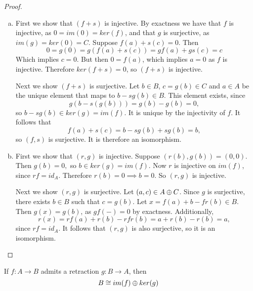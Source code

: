 \begin{proof}
\begin{enumerate}[(a)]
\item First we show that $(f+s)$ is injective. By exactness we have that $f$ is injective, as $0=im(0)=ker(f)$, and that $g$ is surjective, as $im(g)=ker(0)=C$. Suppose $f(a)+s(c)=0$. Then $$0=g(0)=g(f(a)+s(c))=gf(a)+gs(c)=c$$
Which implies $c=0$. But then $0=f(a)$, which implies $a=0$ as $f$ is injective. Therefore $ker(f+s)=0$, so $(f+s)$ is injective.

Next we show $(f+s)$ is surjective. Let $b\in B$, $c=g(b)\in C$ and $a\in A$ be the unique element that maps to $b-sg(b)\in B$. This element exists, since $$g(b-s(g(b)))=g(b)-g(b)=0,$$ so $b-sg(b)\in ker(g)=im(f)$. It is unique by the injectivity of $f$. It follows that $$f(a)+s(c)=b-sg(b)+sg(b)=b,$$ so $(f,s)$ is surjective. It is therefore an isomorphism.

\item First we show that $(r,g)$ is injective. Suppose $(r(b),g(b))=(0,0)$. Then $g(b)=0,$ so $b\in ker(g)=im(f)$. Now $r$ is injective on $im(f)$, since $rf=id_A$. Therefore $r(b)=0\implies b=0$. So $(r,g)$ is injective.

Next we show $(r,g)$ is surjective. Let $(a,c)\in A\oplus C$. Since $g$ is surjective, there exists $b\in B$ such that $c=g(b)$. Let $x=f(a)+b-fr(b)\in B$. Then $g(x)=g(b)$, as $gf(-)=0$ by exactness. Additionally, $$r(x)=rf(a)+r(b)-rfr(b)=a+r(b)-r(b)=a,$$
since $rf=id_A$. It follows that $(r,g)$ is also surjective, so it is an isomorphism.
\end{enumerate}

\end{proof}
\begin{corollary}\label{retraction-iso}
If $f:A\rightarrow B$ admits a retraction $g:B\rightarrow A$, then $$B\cong im(f)\oplus ker(g)$$
\end{corollary}

